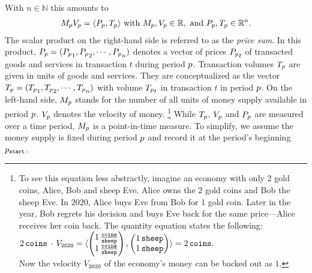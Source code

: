 With $n\in\mathbb{N}$ this amounts to
%
\begin{align}%
\label{eq:fisher}
  \Mp \Vp=\langle\Pp,\Tp\rangle\ \text{with}\ \Mp, \Vp \in \mathbb{R},\ 
  \text{and}\ \Pp,\Tp \in \mathbb{R}^{n}.%
\end{align}
The scalar product on the right-hand side is referred to as the \textit{price
  sum}.  In this product, \( {P_{p}}=( {P_{p}}_{1},{P_{p}}_{2}, \cdots , {P_{p}}_{n} ) \)
denotes a vector of prices ${P_{p}}_t$ of transacted goods and services in
transaction $t$ during period ${p}$.  Transaction volumes \( {T_{p}} \) are
given in units of goods and services. %
They are conceptualized as the vector %
\( {T_{p}}=( {T_{p}}_{1},{T_{p}}_{2}, \cdots , {T_{p}}_{n} ) \) %
with volume ${T_{p}}_t$ in transaction $t$ in period ${p}$.  On the left-hand
side, ${M_{p}}$ stands for the number of all units of money supply available in
period ${p}$. %
${V_{p}}$ denotes the velocity of money.%
\footnote{\label{sheep-note} To see this equation less abstractly, imagine an
  economy with only 2 gold coins, Alice, Bob and sheep Eve. %
  Alice owns the 2 gold coins and Bob the sheep Eve. %
  In $2020$, Alice buys Eve from Bob for 1 gold coin. %
  Later in the year, Bob regrets his decision and buys Eve back for the same
  price---Alice receives her coin back. %
  The quantity equation states the following:\\%
  $ \displaystyle
  \begin{aligned}%
    2\,\coins \, \cdot \, V_{\mathtt{2020}} = %
    \langle\begin{pmatrix}%
    	1\,\frac{\coins}{\sheep} \\%
    	1\,\frac{\coins}{\sheep}%
    \end{pmatrix}, %
    \begin{pmatrix}%
    	1\,\sheep \\%
    	1\,\sheep%
    \end{pmatrix}\rangle %
    = 2\,\coins.%
  \end{aligned} %
  $ \\%
  Now the velocity $V_{\mathtt{2020}}$ of the economy's money can be backed out
  as $1$.%
} %
%
While \({T_{p}}\), \({V_{p}}\) and \({P_{p}}\) are measured over a time period, \({M_{p}}\) %
is a point-in-time measure. %
To simplify, we assume the money supply is fixed during period \({p}\)
and record it at the period's beginning \({p}_{\mathtt{start}}\). %

